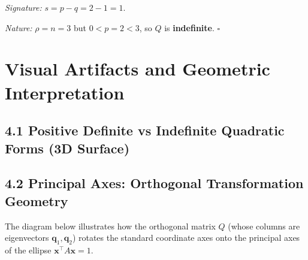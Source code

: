 \documentclass[12pt,a4paper]{article}
\begin{document}
\textit{Signature:} $s = p - q = 2 - 1 = 1$.

\textit{Nature:} $\rho = n = 3$ but $0 < p = 2 < 3$, so $Q$ is \textbf{indefinite}. \hfill$\square$

\section{Visual Artifacts and Geometric Interpretation}

\subsection*{4.1 Positive Definite vs Indefinite Quadratic Forms (3D Surface)}

\begin{center}
\hspace{1cm}
\end{center}

\subsection*{4.2 Principal Axes: Orthogonal Transformation Geometry}

The diagram below illustrates how the orthogonal matrix $Q$ (whose columns are eigenvectors $\mathbf{q}_1, \mathbf{q}_2$) rotates the standard coordinate axes onto the principal axes of the ellipse $\mathbf{x}^{\top}A\mathbf{x} = 1$.
\end{document}
